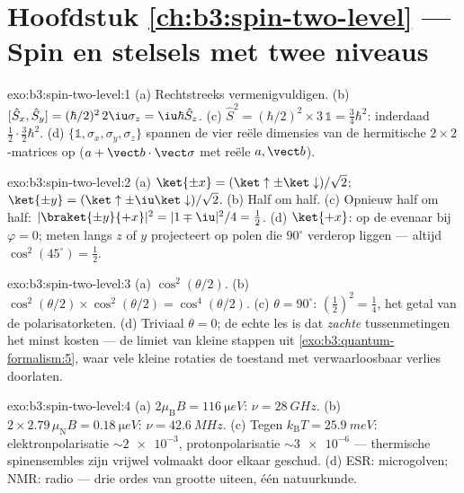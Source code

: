 \section*{Hoofdstuk \ref{ch:b3:spin-two-level} --- Spin en stelsels met twee niveaus}

\begin{solution}{exo:b3:spin-two-level:1}
(a) Rechtstreeks vermenigvuldigen. (b) $[\hat S_x, \hat S_y] =
(\hbar/2)^2\,2\iu\sigma_z = \iu\hbar\hat S_z$. (c) $\hat S^2 =
(\hbar/2)^2 \times 3\,\mathbb 1 = \tfrac34\hbar^2$: inderdaad
$\tfrac12\cdot\tfrac32\hbar^2$. (d) $\{\mathbb 1, \sigma_x,
\sigma_y, \sigma_z\}$ spannen de vier reële dimensies van de hermitische
$2\times2$-matrices op ($a + \vect b\cdot\vect\sigma$ met reële $a,
\vect b$).
\end{solution}

\begin{solution}{exo:b3:spin-two-level:2}
(a) $\ket{\pm x} = (\ket\uparrow \pm \ket\downarrow)/\sqrt2$;
$\ket{\pm y} = (\ket\uparrow \pm \iu\ket\downarrow)/\sqrt2$. (b) Half om
half. (c) Opnieuw half om half: $|\braket{\pm y}{+x}|^2 =
|1 \mp \iu|^2/4 = \tfrac12$. (d) $\ket{+x}$: op de evenaar bij $\varphi =
0$; meten langs $z$ of $y$ projecteert op polen die $90^\circ$ verderop
liggen --- altijd $\cos^2(45^\circ) = \tfrac12$.
\end{solution}

\begin{solution}{exo:b3:spin-two-level:3}
(a) $\cos^2(\theta/2)$. (b) $\cos^2(\theta/2) \times
\cos^2(\theta/2) = \cos^4(\theta/2)$. (c) $\theta = 90^\circ$:
$(\tfrac12)^2 = \tfrac14$, het getal van de polarisatorketen. (d)
Triviaal $\theta = 0$; de echte les is dat \emph{zachte} tussenmetingen
het minst kosten --- de limiet van kleine stappen uit
\cref{exo:b3:quantum-formalism:5}, waar vele kleine rotaties de toestand
met verwaarloosbaar verlies doorlaten.
\end{solution}

\begin{solution}{exo:b3:spin-two-level:4}
(a) $2\mu_{\text{B}}B = \qty{116}{\micro eV}$: $\nu =
\qty{28}{GHz}$. (b) $2 \times 2.79\,\mu_{\text{N}}B =
\qty{0.18}{\micro eV}$: $\nu = \qty{42.6}{MHz}$. (c) Tegen
$k_{\text{B}}T = \qty{25.9}{meV}$: elektronpolarisatie
$\sim\num{2e-3}$, protonpolarisatie $\sim\num{3e-6}$ --- thermische
spinensembles zijn vrijwel volmaakt door elkaar geschud. (d) ESR:
microgolven; NMR: radio --- drie ordes van grootte uiteen, één
natuurkunde.
\end{solution}

